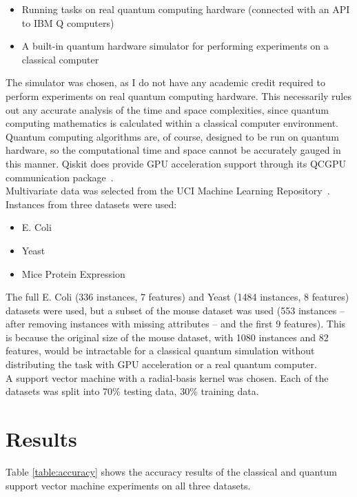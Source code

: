 \documentclass{article}
\begin{document}
    \begin{itemize}
      \item{Running tasks on real quantum computing hardware (connected with an API to IBM Q computers)}
      \item{A built-in quantum hardware simulator for performing experiments on a classical computer}
    \end{itemize}

  The simulator was chosen, as I do not have any academic credit required to perform experiments on real quantum computing hardware. This necessarily rules out any accurate analysis of the time and space complexities, since quantum computing mathematics is calculated within a classical computer environment. Quantum computing algorithms are, of course, designed to be run on quantum hardware, so the computational time and space cannot be accurately gauged in this manner. Qiskit does provide GPU acceleration support through its QCGPU communication package~\cite{qcgpu}. \\

  Multivariate data was selected from the UCI Machine Learning Repository~\cite{uci}. Instances from three datasets were used:

    \begin{itemize}
      \item E. Coli~\cite{ecoli}
      \item Yeast~\cite{yeast}
      \item Mice Protein Expression~\cite{mouse}
    \end{itemize}

  The full E. Coli (336 instances, 7 features) and Yeast (1484 instances, 8 features) datasets were used, but a subset of the mouse dataset was used (553 instances -- after removing instances with missing attributes -- and the first 9 features). This is because the original size of the mouse dataset, with 1080 instances and 82 features, would be intractable for a classical quantum simulation without distributing the task with GPU acceleration or a real quantum computer. \\

  A support vector machine with a radial-basis kernel was chosen. Each of the datasets was split into 70\% testing data, 30\% training data.

\section{Results}
    Table \ref{table:accuracy} shows the accuracy results of the classical and quantum support vector machine experiments on all three datasets. \\
\end{document}
